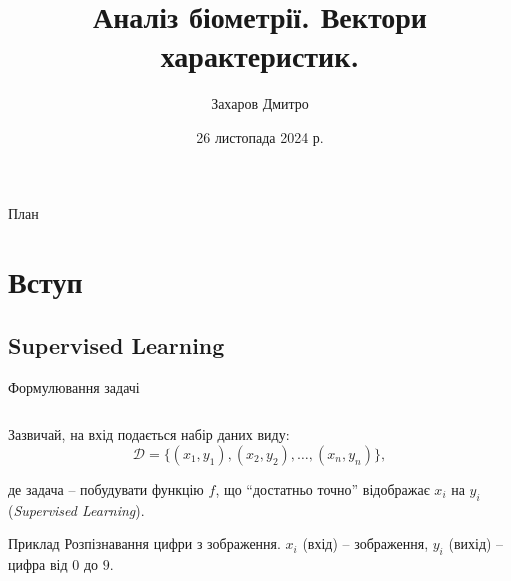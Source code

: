 \documentclass{zkdl-presentation-template}
\title{\textbf{Аналіз біометрії. Вектори характеристик.}}
\author{Захаров Дмитро}
\date{26 листопада 2024 р.}
\begin{document}
	\frame {
		\titlepage
	}
 
	\begin{frame}{План}
        \tableofcontents
    \end{frame}
	 
	\section{Вступ}
	\subsection{Supervised Learning}
	\begin{frame}{Формулювання задачі}	
		\begin{columns}
            \begin{column}{0.6\textwidth}
                Зазвичай, на вхід подається набір даних виду:
                \begin{equation*}
                    \mathcal{D} = \{(x_1,y_1),(x_2,y_2),\dots,(x_n,y_n)\},
                \end{equation*}
                
                де задача -- побудувати функцію $f$, що ``достатньо точно'' відображає $x_i$ на $y_i$ (\textit{Supervised Learning}).
    
                \begin{exampleblock}{Приклад}
                    Розпізнавання цифри з зображення. $x_i$ (вхід) -- зображення, $y_i$ (вихід) -- цифра від $0$ до $9$.
                \end{exampleblock}
            \end{column}


\end{columns}
\end{frame}
\end{document}
